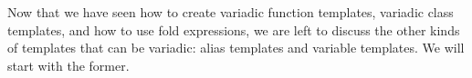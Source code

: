 Now that we have seen how to create variadic function templates, variadic class templates, and how to use fold expressions, we are left to discuss the other kinds of templates that can be variadic: alias templates and variable templates. We will start with the former.




















